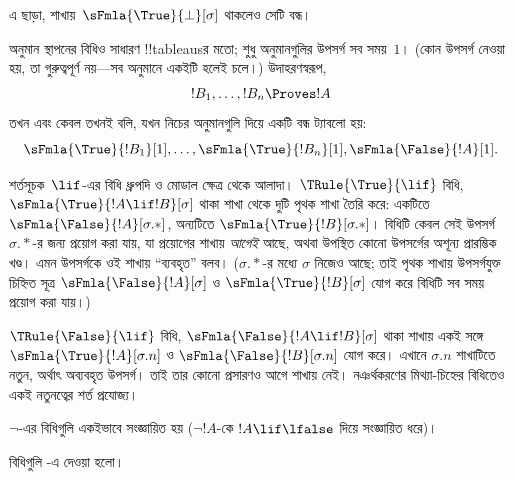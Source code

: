 \documentclass[../../../include/open-logic-section]{subfiles}
\begin{document}
এ ছাড়া, শাখায়~$\sFmla{\True}{\bot}[\sigma]$ থাকলেও সেটি বন্ধ।

অনুমান স্থাপনের বিধিও সাধারণ !!{tableau}sর মতো;
শুধু অনুমানগুলির উপসর্গ সব সময়~$1$। (কোন উপসর্গ নেওয়া
হয়, তা গুরুত্বপূর্ণ নয়—সব অনুমানে একইটি হলেই চলে।)
উদাহরণস্বরূপ,
\[
!B_1, \dots, !B_n \Proves !A
\]
তখন এবং কেবল তখনই বলি, যখন নিচের অনুমানগুলি দিয়ে একটি বন্ধ ট্যাবলো হয়:
\[
\sFmla{\True}{!B_1}[1], \dots, \sFmla{\True}{!B_n}[1],
\sFmla{\False}{!A}[1].
\]

শর্তসূচক~$\lif$-এর বিধি ধ্রুপদি ও মোডাল ক্ষেত্র থেকে আলাদা।
$\TRule{\True}{\lif}$ বিধি, $\sFmla{\True}{!A \lif !B}[\sigma]$
থাকা শাখা থেকে দুটি পৃথক শাখা তৈরি করে: একটিতে
$\sFmla{\False}{!A}[\sigma.{*}]$, অন্যটিতে
$\sFmla{\True}{!B}[\sigma.{*}]$। বিধিটি কেবল সেই
উপসর্গ~$\sigma.{*}$-র জন্য প্রয়োগ করা যায়, যা প্রয়োগের
শাখায় \emph{আগেই} আছে, অথবা উপস্থিত কোনো উপসর্গের
অশূন্য প্রারম্ভিক খণ্ড।
এমন উপসর্গকে ওই শাখায় ``ব্যবহৃত'' বলব। ($\sigma.{*}$-র মধ্যে $\sigma$ নিজেও
আছে; তাই পৃথক শাখায় উপসর্গযুক্ত চিহ্নিত সূত্র
$\sFmla{\False}{!A}[\sigma]$ ও
$\sFmla{\True}{!B}[\sigma]$ যোগ করে বিধিটি সব সময়
প্রয়োগ করা যায়।)

$\TRule{\False}{\lif}$ বিধি,
$\sFmla{\False}{!A \lif !B}[\sigma]$ থাকা শাখায় একই সঙ্গে
$\sFmla{\True}{!A}[\sigma.n]$ ও
$\sFmla{\False}{!B}[\sigma.n]$ যোগ করে। এখানে
$\sigma.n$ শাখাটিতে নতুন, অর্থাৎ অব্যবহৃত উপসর্গ। তাই তার
কোনো প্রসারণও আগে শাখায় নেই। নঞর্থকরণের মিথ্যা-চিহ্নের
বিধিতেও একই নতুনত্বের শর্ত প্রযোজ্য।

$\lnot$-এর বিধিগুলি একইভাবে সংজ্ঞায়িত হয়
($\lnot !A$-কে $!A \lif \lfalse$ দিয়ে সংজ্ঞায়িত ধরে)।

বিধিগুলি -এ দেওয়া হলো।
\end{document}
